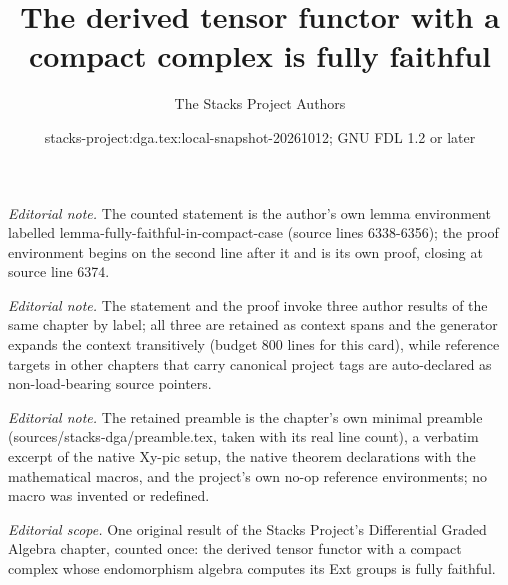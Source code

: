 \documentclass{stacks-project}
\title{The derived tensor functor with a compact complex is fully faithful}
\author{The Stacks Project Authors}
\date{stacks-project:dga.tex:local-snapshot-20261012; GNU FDL 1.2 or later}
\theoremstyle{plain}
\theoremstyle{definition}
\theoremstyle{remark}
\numberwithin{equation}{subsection}
\begin{document}
\maketitle
\noindent\textit{Editorial note.} The counted statement is the author's own lemma environment labelled lemma-fully-faithful-in-compact-case (source lines 6338-6356); the proof environment begins on the second line after it and is its own proof, closing at source line 6374.\par\medskip
\noindent\textit{Editorial note.} The statement and the proof invoke three author results of the same chapter by label; all three are retained as context spans and the generator expands the context transitively (budget 800 lines for this card), while reference targets in other chapters that carry canonical project tags are auto-declared as non-load-bearing source pointers.\par\medskip
\noindent\textit{Editorial note.} The retained preamble is the chapter's own minimal preamble (sources/stacks-dga/preamble.tex, taken with its real line count), a verbatim excerpt of the native Xy-pic setup, the native theorem declarations with the mathematical macros, and the project's own no-op reference environments; no macro was invented or redefined.\par\medskip
\noindent\textit{Editorial scope.} One original result of the Stacks Project's Differential Graded Algebra chapter, counted once: the derived tensor functor with a compact complex whose endomorphism algebra computes its Ext groups is fully faithful.\par\medskip
\end{document}
